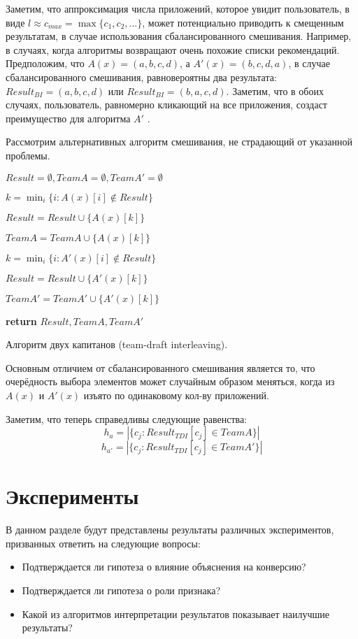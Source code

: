 \documentclass[12pt,a4paper]{report}
\begin{document}
Заметим, что аппроксимация числа приложений, которое увидит пользователь, в виде $l \approx c_{max} = \max\{c_1,c_2,\dots\}$, может потенциально приводить к смещенным результатам, в случае использования сбалансированного смешивания. Например, в случаях, когда алгоритмы возвращают очень похожие списки рекомендаций. Предположим, что $A(x) = (a, b, c, d)$, а $A'(x) = (b, c, d, a)$, в случае сбалансированного смешивания, равновероятны два результата: $Result_{BI}=(a, b, c, d)$ или $Result_{BI}=(b, a, c, d)$. Заметим, что в обоих случаях, пользователь, равномерно кликающий на все приложения, создаст преимущество для алгоритма $A'$ \cite{Down}.

Рассмотрим альтернативных алгоритм смешивания, не страдающий от указанной проблемы.


\begin{algorithm}[H]
\SetAlgoLined
{}
$Result = \emptyset, TeamA = \emptyset, TeamA' = \emptyset$

 {
	 {
		$k=\min_i\{i: A(x)[i]\notin Result\}$
		
		$Result = Result \cup \{A(x)[k]\}$
		
		$TeamA = TeamA \cup \{A(x)[k]\}$
	} {
		$k=\min_i\{i: A'(x)[i]\notin Result\}$
				
		$Result = Result \cup \{A'(x)[k]\}$
		
		$TeamA' = TeamA' \cup \{A'(x)[k]\}$
	}
}
\textbf{return} $Result, TeamA, TeamA'$
\caption{Алгоритм двух капитанов (team-draft interleaving).}
\label{alg:BI}
\end{algorithm}

Основным отличием от сбалансированного смешивания является то, что очерёдность выбора элементов может случайным образом меняться, когда из $A(x)$ и $A'(x)$ изъято по одинаковому кол-ву приложений.

Заметим, что теперь справедливы следующие равенства:
\begin{equation*}
h_a = |\{c_j: Result_{TDI}[c_j] \in TeamA\}|
\end{equation*}
\begin{equation*}
h_{a'} = |\{c_j: Result_{TDI}[c_j] \in TeamA'\}|
\end{equation*}

\section{Эксперименты}
В данном разделе будут представлены результаты различных экспериментов, призванных ответить на следующие вопросы:
\begin{itemize}
\item Подтверждается ли гипотеза о влияние объяснения на конверсию?
\item Подтверждается ли гипотеза о роли признака?
\item Какой из алгоритмов интерпретации результатов показывает наилучшие результаты?
\end{itemize}
\end{document}
